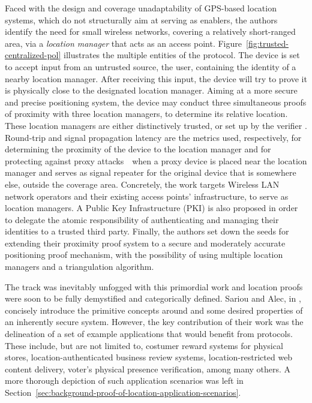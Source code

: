 Faced with the design and coverage unadaptability of GPS-based location systems, which do not structurally aim at serving as \pol{} enablers, the authors identify the need for small wireless networks, covering a relatively short-ranged area, via a \emph{location manager} that acts as an access point. Figure~\ref{fig:trusted-centralized-pol} illustrates the multiple entities of the protocol. The device is set to accept input from an untrusted source, the user, containing the identity of a nearby location manager. After receiving this input, the device will try to prove it is physically close to the designated location manager. Aiming at a more secure and precise positioning system, the device may conduct three simultaneous proofs of proximity with three location managers, to determine its relative location. These location managers are either distinctively trusted, or set up by the verifier \cite{waters2003secure}. Round-trip and signal propagation latency are the metrics used, respectively, for determining the proximity of the device to the location manager and for protecting against proxy attacks~\textemdash~when a proxy device is placed near the location manager and serves as signal repeater for the original device that is somewhere else, outside the coverage area. Concretely, the work targets Wireless LAN network operators and their existing access points' infrastructure, to serve as location managers. A Public Key Infrastructure (PKI) is also proposed in order to delegate the atomic responsibility of authenticating and managing their identities to a trusted third party. Finally, the authors set down the seeds for extending their proximity proof system to a secure and moderately accurate positioning proof mechanism, with the possibility of using multiple location managers and a triangulation algorithm.

The \pol{} track was inevitably unfogged with this primordial work and location proofs were soon to be fully demystified and categorically defined. Sariou and Alec, in \cite{saroiu2009enabling}, concisely introduce the primitive concepts around \pol{} and some desired properties of an inherently secure system. However, the key contribution of their work was the delineation of a set of example applications that would benefit from \pol{} protocols. These include, but are not limited to, costumer reward systems for physical stores, location-authenticated business review systems, location-restricted web content delivery, voter's physical presence verification, among many others. A more thorough depiction of such application scenarios was left in Section~\ref{sec:background-proof-of-location-application-scenarios}.

